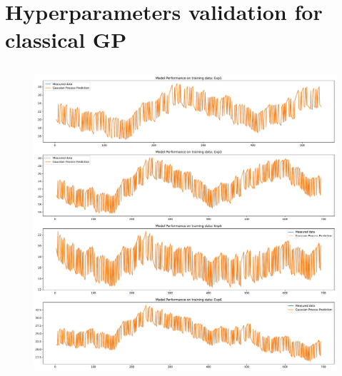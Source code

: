 \clearpage

\section{Hyperparameters validation for classical GP}\label{apx:hyperparams_gp}

\subsection{\texorpdfstring{}{113}}

\begin{figure}[ht]
    \centering
    \includegraphics[width = \textwidth]{Plots/GP_113_training_performance.pdf}
    \caption{}
    \label{fig:GP_train_validation}
\end{figure}

